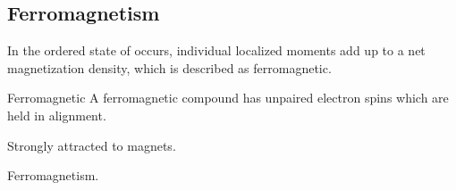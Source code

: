 \documentclass[hidelinks]{article}
\begin{document}


\subsection{Ferromagnetism} %
\label{sub:ferromagnetism}

In the ordered state of  occurs, individual localized moments add up to a net magnetization density, which is described as ferromagnetic.
\begin{termdef}[\baselineskip]{Ferromagnetic}
    A ferromagnetic compound has unpaired electron spins which are held in alignment.
    \begin{citemize}
        \item Strongly attracted to magnets.
    \end{citemize}
\end{termdef}%
\begin{marginfigure}%
\captionsetup{justification=raggedright, width=1.5in}
    \caption{Ferromagnetism.}%
\end{marginfigure}%


\end{document}
